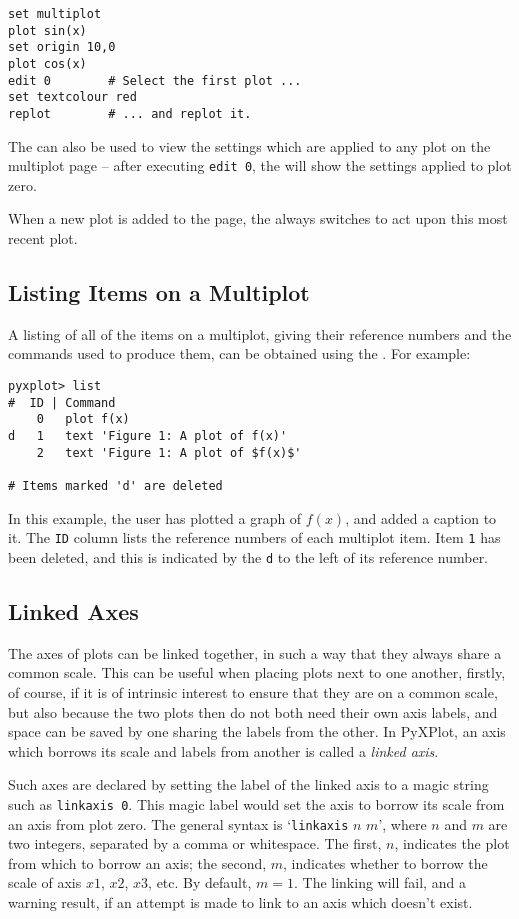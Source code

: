 \begin{verbatim} 
set multiplot
plot sin(x)
set origin 10,0
plot cos(x)
edit 0        # Select the first plot ...
set textcolour red
replot        # ... and replot it.
\end{verbatim}

The  can also be used to view the settings which are applied to
any plot on the multiplot page -- after executing {\tt edit~0}, the
 will show the settings applied to plot zero.

When a new plot is added to the page, the  always switches to
act upon this most recent plot.

\subsection{Listing Items on a Multiplot}

A listing of all of the items on a multiplot, giving their reference numbers
and the commands used to produce them, can be obtained using the
. For example:

\begin{verbatim}
pyxplot> list
#  ID | Command 
    0   plot f(x) 
d   1   text 'Figure 1: A plot of f(x)' 
    2   text 'Figure 1: A plot of $f(x)$' 

# Items marked 'd' are deleted 
\end{verbatim}

In this example, the user has plotted a graph of $f(x)$, and added a caption to
it. The {\tt ID} column lists the reference numbers of each multiplot item.
Item {\tt 1} has been deleted, and this is indicated by the {\tt d} to the left
of its reference number.

\subsection{Linked Axes}

The axes of plots can be linked together, in such a way that they always share
a common scale. This can be useful when placing plots next to one another,
firstly, of course, if it is of intrinsic interest to ensure that they are on a
common scale, but also because the two plots then do not both need their own
axis labels, and space can be saved by one sharing the labels from the other.
In PyXPlot, an axis which borrows its scale and labels from another is called a
{\it linked axis}.

Such axes are declared by setting the label of the linked axis to a magic
string such as {\tt linkaxis 0}\label{linked_axes}. This magic label would set the axis to borrow
its scale from an axis from plot zero. The general syntax is `{\tt linkaxis}
$n$ $m$', where $n$ and $m$ are two integers, separated by a comma or
whitespace. The first, $n$, indicates the plot from which to borrow an axis;
the second, $m$, indicates whether to borrow the scale of axis $x1$, $x2$,
$x3$, etc. By default, $m=1$. The linking will fail, and a warning result, if
an attempt is made to link to an axis which doesn't exist.

